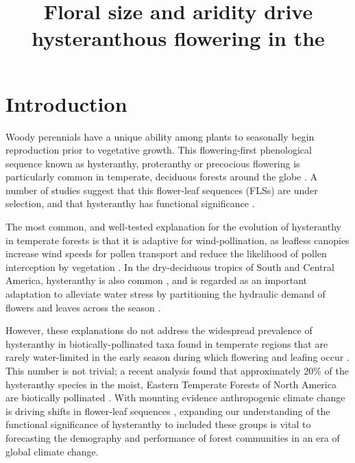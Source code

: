 \documentclass{article}[11pt]
\title{Floral size and aridity drive hysteranthous flowering in the }
\begin{document}

\maketitle


\section*{Introduction}
\noindent Woody perennials have a unique ability among plants to seasonally begin reproduction prior to vegetative growth. This flowering-first phenological sequence known as hysteranthy, proteranthy or precocious flowering is particularly common in temperate, deciduous forests around the globe \citep{Rathcke_1985}. A number of studies suggest that this flower-leaf sequences (FLSs) are under selection, and that hysteranthy has functional significance \citep{Gougherty2018,Buonaiuto2020,Guo2014}.

\noindent The most common, and well-tested explanation for the evolution of hysteranthy in temperate forests is that it is adaptive for wind-pollination, as leafless canopies increase wind speeds for pollen transport and reduce the likelihood of pollen interception by vegetation \citep{Whitehead1969,Niklas1985}. In the dry-deciduous tropics of South and Central America, hysteranthy is also common \citep{Rathcke_1985,Franklin2016}, and is regarded as an important adaptation to alleviate water stress by partitioning the hydraulic demand of flowers and leaves across the season \citep{Gougherty2018,Franklin2016,Borchert1983,Reich1984}.

However, these explanations do not address the widespread prevalence of hysteranthy in biotically-pollinated taxa found in temperate regions that are rarely water-limited in the early season during which flowering and leafing occur \citep{Polgar2011}. This number is not trivial; a recent analysis found that approximately 20\% of the hysteranthy species in the moist, Eastern Temperate Forests of North America are biotically pollinated \citep{Buonaiuto2020}. With mounting evidence anthropogenic climate change is driving shifts in flower-leaf sequences \citep{Ma2020:aa}, expanding our understanding of the functional significance of hysteranthy to included these groups is vital to forecasting the demography and performance of forest communities in an era of global climate change.
\end{document}
